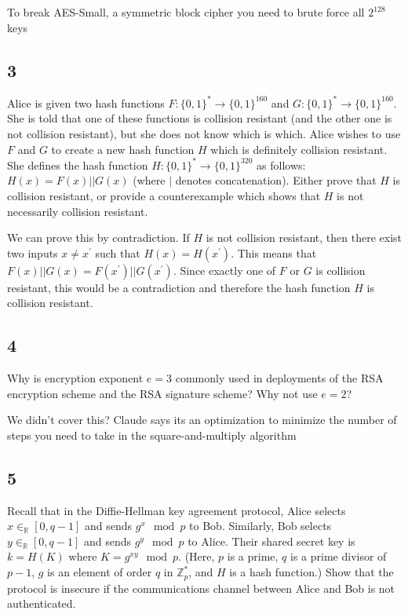 \documentclass[11pt]{article}
\begin{document}
To break AES-Small, a symmetric block cipher you need to brute force all $2^{128}$ keys

\subsection{3} Alice is given two hash functions $F : \{0, 1\}^* \to \{0, 1\}^{160}$ and $G : \{0, 1\}^* \to \{0, 1\}^{160}$. She is told that one of these functions is collision resistant (and the other one is not collision resistant), but she does not know which is which. Alice wishes to use $F$ and $G$ to create a new hash function $H$ which is deﬁnitely collision resistant. She deﬁnes the hash function $H : \{0, 1\}^* \to \{0, 1\}^{320}$ as follows: $H(x) = F(x) || G(x)$ (where $\mathbin{|} $ denotes concatenation). Either prove that $H$ is collision resistant, or provide a counterexample which shows that $H$ is not necessarily collision resistant.

We can prove this by contradiction. If $H$ is not collision resistant, then there exist two inputs $x \neq x^\prime$ such that $H(x) = H(x^\prime)$. This means that $F(x) || G(x) = F(x^\prime) || G(x^\prime)$. Since exactly one of $F$ or $G$ is collision resistant, this would be a contradiction and therefore the hash function $H$ is collision resistant.

\subsection{4} Why is encryption exponent $e = 3$ commonly used in deployments of the RSA encryption scheme and the RSA signature scheme? Why not use $e = 2$?

We didn't cover this? Claude says its an optimization to minimize the number of steps you need to take in the square-and-multiply algorithm

\subsection{5} Recall that in the Diﬃe-Hellman key agreement protocol, Alice selects $x \in_\mathbb{R} [0, q - 1]$ and sends $g^x \mod p$ to Bob. Similarly, Bob selects $y \in_\mathbb{R} [0, q - 1]$ and sends $g^y \mod p$ to Alice. Their shared secret key is $k = H(K)$ where $K = g^{xy} \mod p$. (Here, $p$ is a prime, $q$ is a prime divisor of $p - 1$, $g$ is an element of order $q$ in $\mathbb{Z}^*_p$, and $H$ is a hash function.) Show that the protocol is insecure if the communications channel between Alice and Bob is not authenticated.
\end{document}
